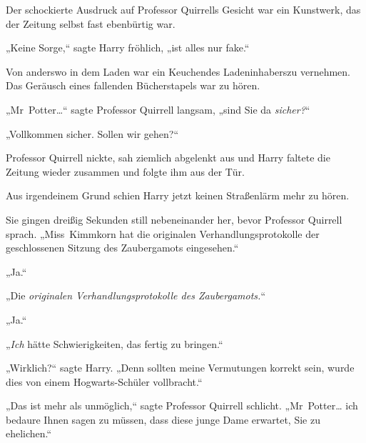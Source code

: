 Der schockierte Ausdruck auf Professor Quirrells Gesicht war ein Kunstwerk, das der Zeitung selbst fast ebenbürtig war.

„Keine Sorge,“ sagte Harry fröhlich, „ist alles nur fake.“

Von anderswo in dem Laden war ein Keuchendes Ladeninhaberszu vernehmen. Das Geräusch eines fallenden Bücherstapels war zu hören.

„Mr~Potter…“ sagte Professor Quirrell langsam, „sind Sie da \emph{sicher?}“

„Vollkommen sicher. Sollen wir gehen?“

Professor Quirrell nickte, sah ziemlich abgelenkt aus und Harry faltete die Zeitung wieder zusammen und folgte ihm aus der Tür.

Aus irgendeinem Grund schien Harry jetzt keinen Straßenlärm mehr zu hören.

Sie gingen dreißig Sekunden still nebeneinander her, bevor Professor Quirrell sprach. „Miss~Kimmkorn hat die originalen Verhandlungsprotokolle der geschlossenen Sitzung des Zaubergamots eingesehen.“

„Ja.“

„Die \emph{originalen Verhandlungsprotokolle des Zaubergamots.}“

„Ja.“

„\emph{Ich} hätte Schwierigkeiten, das fertig zu bringen.“

„Wirklich?“ sagte Harry. „Denn sollten meine Vermutungen korrekt sein, wurde dies von einem Hogwarts-Schüler vollbracht.“

„Das ist mehr als unmöglich,“ sagte Professor Quirrell schlicht. „Mr~Potter… ich bedaure Ihnen sagen zu müssen, dass diese junge Dame erwartet, Sie zu ehelichen.“

